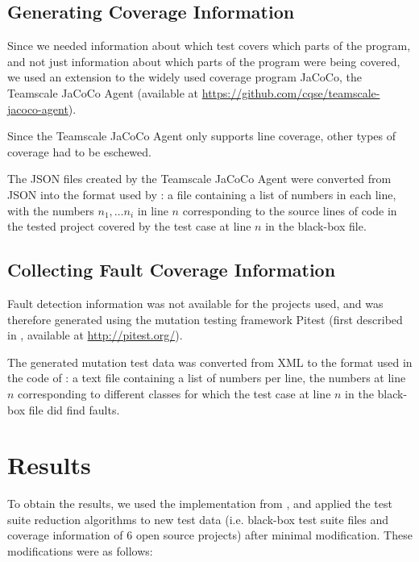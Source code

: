 \subsection{Generating Coverage Information}

Since we needed information about which test covers which parts
of the program, and not just information about which parts of the
program were being covered, we used an extension to the widely used
coverage program JaCoCo, the Teamscale JaCoCo Agent (available at
\url{https://github.com/cqse/teamscale-jacoco-agent}).

Since the Teamscale JaCoCo Agent only supports line coverage, other
types of coverage had to be eschewed.

The JSON files created by the Teamscale JaCoCo Agent were converted
from JSON into the format used by \cite{cruciani2019scalable}: a file
containing a list of numbers in each line, with the numbers $n_1, \dots
n_i$ in line $n$ corresponding to the source lines of code in the tested
project covered by the test case at line $n$ in the black-box file.

\subsection{Collecting Fault Coverage Information}

Fault detection information was not available for the projects used, and
was therefore generated using the mutation testing framework Pitest (first
described in \cite{coles2016pit}, available at \url{http://pitest.org/}).

The generated mutation test data was converted from XML to the format
used in the code of \cite{cruciani2019scalable}: a text file containing
a list of numbers per line, the numbers at line $n$ corresponding to
different classes for which the test case at line $n$ in the black-box
file did find faults.

\section{Results}

To obtain the results, we used the implementation from
\cite{cruciani2019scalable}, and applied the test suite reduction
algorithms to new test data (i.e. black-box test suite files and coverage
information of 6 open source projects) after minimal modification. These
modifications were as follows:

